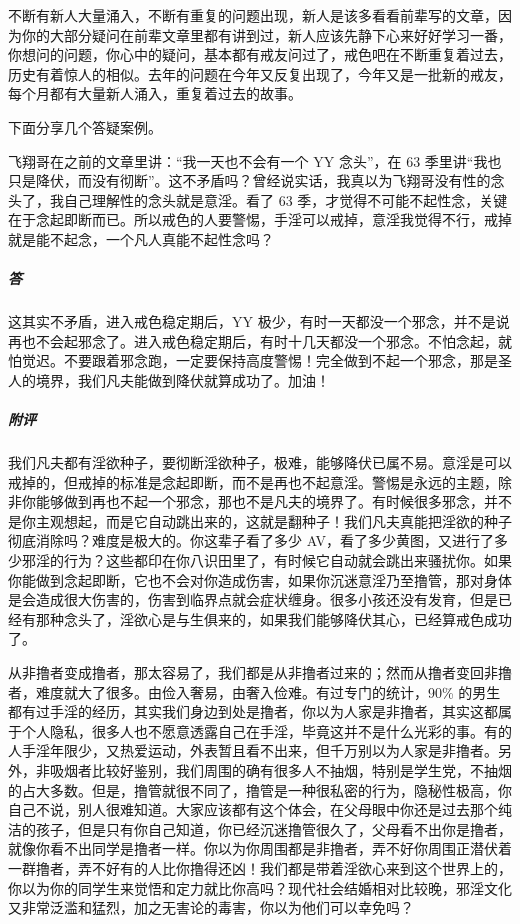 不断有新人大量涌入，不断有重复的问题出现，新人是该多看看前辈写的文章，因为你的大部分疑问在前辈文章里都有讲到过，新人应该先静下心来好好学习一番，你想问的问题，你心中的疑问，基本都有戒友问过了，戒色吧在不断重复着过去，历史有着惊人的相似。去年的问题在今年又反复出现了，今年又是一批新的戒友，每个月都有大量新人涌入，重复着过去的故事。

下面分享几个答疑案例。

\begin{case}
    飞翔哥在之前的文章里讲：“我一天也不会有一个 YY 念头”，在 63 季里讲“我也只是降伏，而没有彻断”。这不矛盾吗？曾经说实话，我真以为飞翔哥没有性的念头了，我自己理解性的念头就是意淫。看了 63 季，才觉得不可能不起性念，关键在于念起即断而已。所以戒色的人要警惕，手淫可以戒掉，意淫我觉得不行，戒掉就是能不起念，一个凡人真能不起性念吗？
    \subparagraph{答} 这其实不矛盾，进入戒色稳定期后，YY 极少，有时一天都没一个邪念，并不是说再也不会起邪念了。进入戒色稳定期后，有时十几天都没一个邪念。不怕念起，就怕觉迟。不要跟着邪念跑，一定要保持高度警惕！完全做到不起一个邪念，那是圣人的境界，我们凡夫能做到降伏就算成功了。加油！
    \subparagraph{附评} 我们凡夫都有淫欲种子，要彻断淫欲种子，极难，能够降伏已属不易。意淫是可以戒掉的，但戒掉的标准是念起即断，而不是再也不起意淫。警惕是永远的主题，除非你能够做到再也不起一个邪念，那也不是凡夫的境界了。有时候很多邪念，并不是你主观想起，而是它自动跳出来的，这就是翻种子！我们凡夫真能把淫欲的种子彻底消除吗？难度是极大的。你这辈子看了多少 AV，看了多少黄图，又进行了多少邪淫的行为？这些都印在你八识田里了，有时候它自动就会跳出来骚扰你。如果你能做到念起即断，它也不会对你造成伤害，如果你沉迷意淫乃至撸管，那对身体是会造成很大伤害的，伤害到临界点就会症状缠身。很多小孩还没有发育，但是已经有那种念头了，淫欲心是与生俱来的，如果我们能够降伏其心，已经算戒色成功了。

    从非撸者变成撸者，那太容易了，我们都是从非撸者过来的；然而从撸者变回非撸者，难度就大了很多。由俭入奢易，由奢入俭难。有过专门的统计，90\% 的男生都有过手淫的经历，其实我们身边到处是撸者，你以为人家是非撸者，其实这都属于个人隐私，很多人也不愿意透露自己在手淫，毕竟这并不是什么光彩的事。有的人手淫年限少，又热爱运动，外表暂且看不出来，但千万别以为人家是非撸者。另外，非吸烟者比较好鉴别，我们周围的确有很多人不抽烟，特别是学生党，不抽烟的占大多数。但是，撸管就很不同了，撸管是一种很私密的行为，隐秘性极高，你自己不说，别人很难知道。大家应该都有这个体会，在父母眼中你还是过去那个纯洁的孩子，但是只有你自己知道，你已经沉迷撸管很久了，父母看不出你是撸者，就像你看不出同学是撸者一样。你以为你周围都是非撸者，弄不好你周围正潜伏着一群撸者，弄不好有的人比你撸得还凶！我们都是带着淫欲心来到这个世界上的，你以为你的同学生来觉悟和定力就比你高吗？现代社会结婚相对比较晚，邪淫文化又非常泛滥和猛烈，加之无害论的毒害，你以为他们可以幸免吗？


\end{case}
